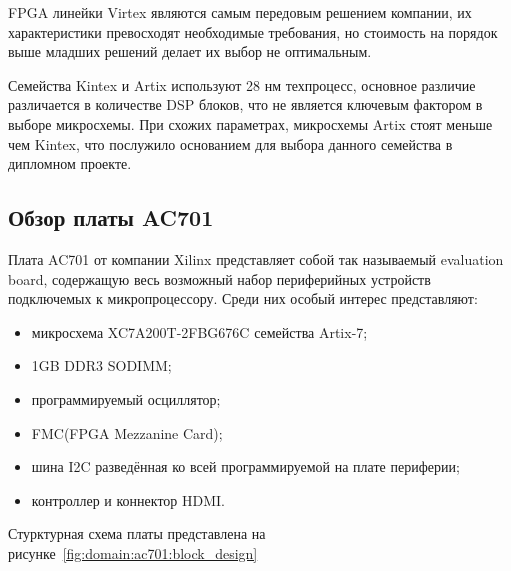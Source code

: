 FPGA линейки Virtex являются самым передовым решением компании, их характеристики превосходят необходимые требования,
но стоимость на порядок выше младших решений делает их выбор не оптимальным.

Семейства Kintex и Artix используют 28 нм техпроцесс, основное различие различается в количестве DSP блоков, что не является
ключевым фактором в выборе микросхемы. При схожих параметрах, микросхемы Artix стоят меньше чем Kintex\cite{artix_kintex_price_comparison},
что послужило основанием для выбора данного семейства в дипломном проекте.





\subsection{Обзор платы AC701}
\label{sub:domain:ac701}

Плата AC701 от компании Xilinx представляет собой так называемый evaluation board,
содержащую весь возможный набор периферийных устройств подключемых к микропроцессору.
Среди них особый интерес представляют:
\begin{itemize}
  \item микросхема XC7A200T-2FBG676C семейства Artix-7;
  \item 1GB DDR3 SODIMM;
  \item программируемый осциллятор;
  \item FMC(FPGA Mezzanine Card);
  \item шина I2C разведённая ко всей программируемой на плате периферии;
  \item контроллер и коннектор HDMI.
\end{itemize}

Стурктурная схема платы представлена на рисунке~\ref{fig:domain:ac701:block_design}

